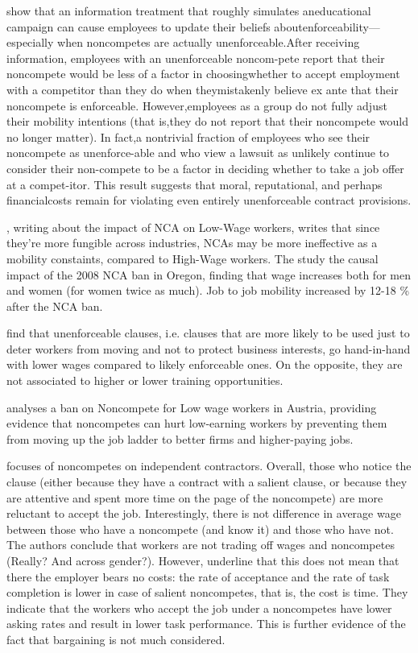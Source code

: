 \documentclass[11pt,a4paper]{article}
\begin{document}
\cite{prescott_subjective_2024} show that an information treatment that roughly simulates aneducational campaign can cause employees to update their beliefs aboutenforceability—especially when noncompetes are actually unenforceable.After receiving information, employees with an unenforceable noncom-pete report that their noncompete would be less of a factor in choosingwhether to accept employment with a competitor than they do when theymistakenly believe ex ante that their noncompete is enforceable. However,employees as a group do not fully adjust their mobility intentions (that is,they do not report that their noncompete would no longer matter). In fact,a nontrivial fraction of employees who see their noncompete as unenforce-able and who view a lawsuit as unlikely continue to consider their non-compete to be a factor in deciding whether to take a job offer at a compet-itor. This result suggests that moral, reputational, and perhaps financialcosts remain for violating even entirely unenforceable contract provisions.

\cite{lipsitz_low-wage_2020}, writing about the impact of NCA on Low-Wage workers, writes that since they're more fungible across industries, NCAs may be more ineffective as a mobility constaints, compared to High-Wage workers. The study the causal impact of the 2008 NCA ban in Oregon, finding that wage increases both for men and women (for women twice as much). Job to job mobility increased by 12-18 \% after the NCA ban. 

\cite{boeri_non-compete_2023} find that unenforceable clauses, i.e. clauses that are more likely to be used
just to deter workers from moving and not to protect business interests, go hand-in-hand with lower
wages compared to likely enforceable ones. On the opposite, they are not associated to higher or lower
training opportunities.

\cite{young_noncompete_2024} analyses a ban on Noncompete for Low wage workers in Austria, providing evidence that noncompetes can hurt low-earning workers by preventing them from moving up the job ladder to better firms and higher-paying jobs. 

\cite{cowgill_clause_2024} focuses of noncompetes on independent contractors. Overall, those who notice the clause (either because they have a contract with a salient clause, or because they are attentive and spent more time on the page of the noncompete) are more reluctant to accept the job. Interestingly, there is not difference in average wage between those who have a noncompete (and know it) and those who have not. The authors conclude that workers are not trading off wages and noncompetes (Really? And across gender?). However, \cite{cowgill_clause_2024} underline that this does not mean that there the employer bears no costs: the rate of acceptance and the rate of task completion is lower in case of salient noncompetes, that is, the cost is time. They indicate that the workers who accept the job under a noncompetes have lower asking rates and result in lower task performance. This is further evidence of the fact that bargaining is not much considered.  
\end{document}
